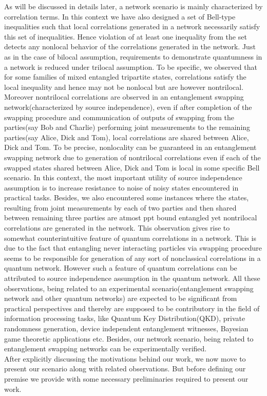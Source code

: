 \documentclass[pra,10pt,twocolumn,superscriptaddress,floatfix,showpacs]{revtex4-1}
\begin{document}
As will be discussed in details later, a network scenario is mainly characterized by correlation terms.  In this context we have also designed a set of Bell-type inequalities such that local correlations generated in a network necessarily satisfy this set of inequalities. Hence violation of at least one inequality from the set detects any nonlocal behavior of the correlations generated in the network. Just as in the case of bilocal assumption, requirements to demonstrate quantumness in a network is reduced under trilocal assumption. To be specific, we observed that for some families of mixed entangled tripartite states, correlations satisfy the local inequality and hence may not be nonlocal but are however nontrilocal. Moreover nontrilocal correlations are observed in an entanglement swapping network(characterized by source independence), even if  after completion of  the swapping procedure and communication of outputs of swapping from the parties(say Bob and Charlie) performing joint measurements to the remaining parties(say Alice, Dick and Tom), local correlations are shared between Alice, Dick and Tom. To be precise, nonlocality can be guaranteed in an entanglement swapping network due to generation of nontrilocal correlations even if each of the swapped states shared between Alice, Dick and Tom is local in some specific Bell scenario\cite{Sliwa}. In this context, the most important utility of source independence assumption is to increase resistance to noise of noisy states encountered in practical tasks. Besides, we also encountered some instances where the states, resulting from joint measurements by each of two parties and then shared between remaining three parties are atmost ppt bound entangled yet nontrilocal correlations are generated in the network. This observation gives rise to somewhat counterintuitive feature of quantum correlations in a network. This is due to the fact that entangling never interacting particles via swapping procedure seems to be responsible for generation of any sort of nonclassical correlations in a quantum network. However such a feature of quantum correlations can be attributed to source independence assumption in the quantum network. All these observations, being related to an experimental scenario(entanglement swapping network and other quantum networks) are expected to be significant from practical perspectives and thereby are supposed to be contributory in the field of information processing tasks, like  Quantum Key Distribution(QKD)\cite{Acin,Mayer,key1,key2}, private randomness generation\cite{Pironio,Colbeck}, device independent entanglement witnesses\cite{Bancal}, Bayesian game theoretic applications \cite{game} etc. Besides, our network scenario, being related to entanglement swapping networks can be experimentally verified. \\
After explicitly discussing the motivations behind our work, we now move to present our scenario along with related observations. But before defining our premise we provide with some necessary preliminaries required to present our work. \\
\end{document}
